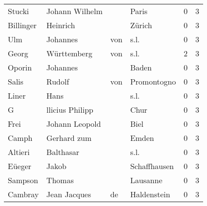\begin{center}
\begin{tiny}
\begin{longtabu}{llllrr}
                   Stucki &                     Johann Wilhelm &             &                                       Paris &          0 &         3 \\
                Billinger &                           Heinrich &             &                                      Zürich &          0 &         3 \\
                      Ulm &                           Johannes &         von &                                        s.l. &          0 &         3 \\
                    Georg &                        Württemberg &         von &                                        s.l. &          2 &         3 \\
                   Oporin &                           Johannes &             &                                       Baden &          0 &         3 \\
                    Salis &                             Rudolf &         von &                                 Promontogno &          0 &         3 \\
                    Liner &                               Hans &             &                                        s.l. &          0 &         3 \\
                        G &                    llicius Philipp &             &                                        Chur &          0 &         3 \\
                     Frei &                     Johann Leopold &             &                                        Biel &          0 &         3 \\
                    Camph &                        Gerhard zum &             &                                       Emden &          0 &         3 \\
                  Altieri &                          Balthasar &             &                                        s.l. &          0 &         3 \\
                   Eüeger &                              Jakob &             &                                Schaffhausen &          0 &         3 \\
                  Sampson &                             Thomas &             &                                    Lausanne &          0 &         3 \\
                  Cambray &                       Jean Jacques &          de &                                 Haldenstein &          0 &         3 \\

\end{longtabu}
\end{tiny}
\end{center}
